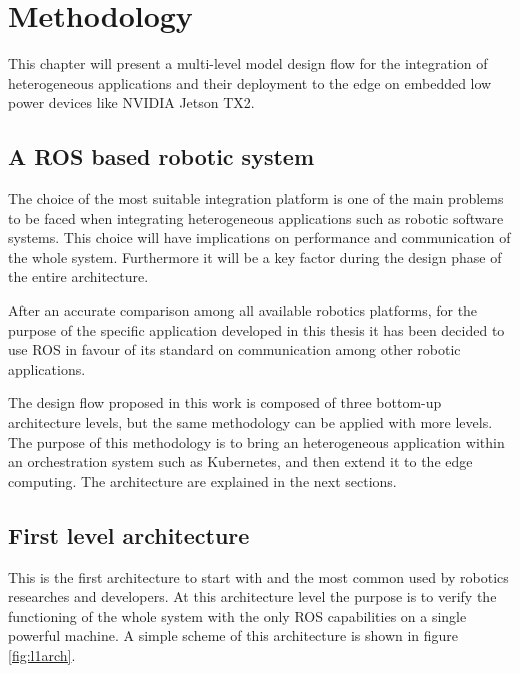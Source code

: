 \chapter{Methodology} \label{chap:methodology}

This chapter will present a multi-level model design flow for the integration of heterogeneous applications and their deployment to the edge on embedded low power devices like NVIDIA Jetson TX2.


\section{A ROS based robotic system}
The choice of the most suitable integration platform is one of the main problems to be faced when integrating heterogeneous applications such as robotic software systems. This choice will have implications on performance and communication of the whole system. Furthermore it will be a key factor during the design phase of the entire architecture.

After an accurate comparison among all available robotics platforms, for the purpose of the specific application developed in this thesis it has been decided to use ROS \cite{ROS} in favour of its standard on communication among other robotic applications.


The design flow proposed in this work is composed of three bottom-up architecture levels, but the same methodology can be applied with more levels.
The purpose of this methodology is to bring an heterogeneous application within an orchestration system such as Kubernetes, and then extend it to the edge computing. %
The architecture are explained in the next sections.




\section{First level architecture}
This is the first architecture to start with and the most common used by robotics researches and developers.
At this architecture level the purpose is to verify the functioning of the whole system with the only ROS capabilities on a single powerful machine. A simple scheme of this architecture is shown in figure \ref{fig:l1arch}.

